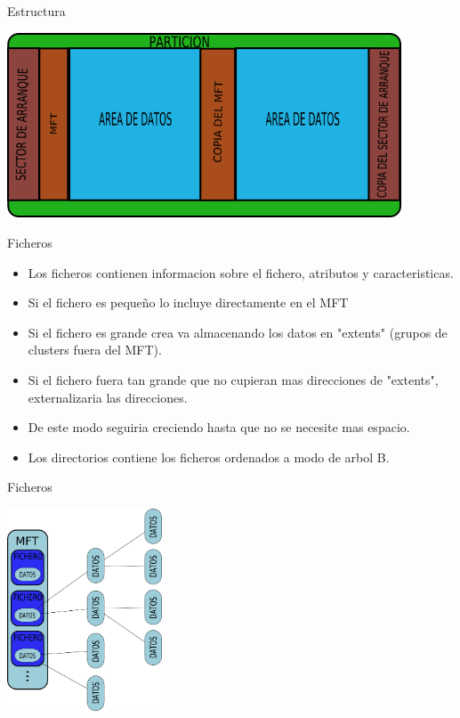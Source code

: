 \begin{frame}{Estructura}
  \begin{center}
    \includegraphics[height=5.5cm]{imgs/ntfs_struct.png}
  \end{center}
\end{frame}

\begin{frame}{Ficheros}
  \begin{itemize}
    \item Los ficheros contienen informacion sobre el fichero, atributos y caracteristicas.
    \item Si el fichero es pequeño lo incluye directamente en el MFT
    \item Si el fichero es grande crea va almacenando los datos en "extents" (grupos de clusters fuera del MFT).
    \item Si el fichero fuera tan grande que no cupieran mas direcciones de "extents", externalizaria las direcciones.
    \item De este modo seguiria creciendo hasta que no se necesite mas espacio.
    \item Los directorios contiene los ficheros ordenados a modo de arbol B.
  \end{itemize}
\end{frame}

\begin{frame}{Ficheros}
  \begin{center}
    \includegraphics[height=6cm]{imgs/ntfs_files.png}
  \end{center}
\end{frame}
